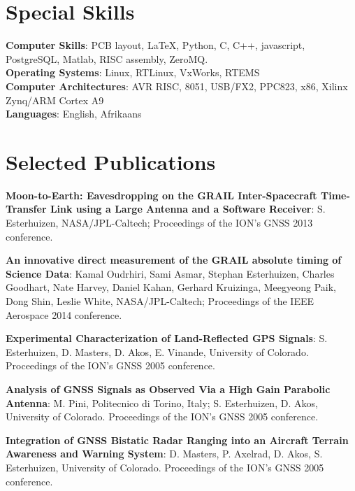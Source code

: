 \begin{resume}
\section{\sc Special Skills}
{\bf Computer Skills}: PCB layout, \LaTeX, Python, C, C++, javascript, PostgreSQL, Matlab,
	RISC assembly, ZeroMQ.\\ 
{\bf Operating Systems}: Linux, RTLinux, VxWorks, RTEMS\\
{\bf Computer Architectures}: AVR RISC, 8051, USB/FX2, PPC823, x86, Xilinx Zynq/ARM Cortex A9\\
{\bf Languages}: English, Afrikaans


\section{\sc Selected Publications}
{\bf Moon-to-Earth: Eavesdropping on the GRAIL Inter-Spacecraft Time-Transfer Link using a Large Antenna and a Software Receiver}: S. Esterhuizen, NASA/JPL-Caltech; Proceedings of the ION's GNSS 2013 conference.

{\bf An innovative direct measurement of the GRAIL absolute timing of Science Data}: Kamal Oudrhiri, Sami Asmar, Stephan Esterhuizen, Charles Goodhart, Nate Harvey, Daniel Kahan, Gerhard Kruizinga, Meegyeong Paik, Dong Shin, Leslie White, NASA/JPL-Caltech; Proceedings of the IEEE Aerospace 2014 conference.

{\bf Experimental Characterization of Land-Reflected GPS Signals}: S. Esterhuizen, D. Masters, D. Akos, E. Vinande, University of Colorado. Proceedings of the ION's GNSS 2005 conference.

{\bf Analysis of GNSS Signals as Observed Via a High Gain Parabolic Antenna}: M. Pini, Politecnico di Torino, Italy; S. Esterhuizen, D. Akos, University of Colorado. Proceedings of the ION's GNSS 2005 conference.

{\bf Integration of GNSS Bistatic Radar Ranging into an Aircraft Terrain Awareness and Warning System}: D. Masters, P. Axelrad, D. Akos, S. Esterhuizen, University of Colorado. Proceedings of the ION's GNSS 2005 conference.


\end{resume}

